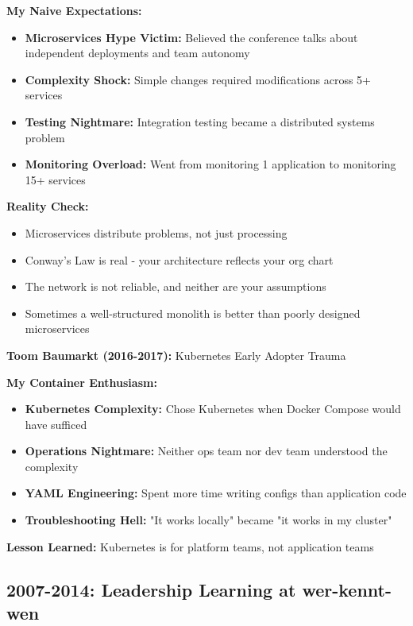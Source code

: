 \documentclass[10pt,a4paper]{article}
\begin{document}
\textbf{My Naive Expectations:}
\begin{itemize}[leftmargin=10pt,itemsep=1pt]
\item \textbf{Microservices Hype Victim:} Believed the conference talks about independent deployments and team autonomy
\item \textbf{Complexity Shock:} Simple changes required modifications across 5+ services
\item \textbf{Testing Nightmare:} Integration testing became a distributed systems problem
\item \textbf{Monitoring Overload:} Went from monitoring 1 application to monitoring 15+ services
\end{itemize}

\textbf{Reality Check:}
\begin{itemize}[leftmargin=10pt,itemsep=1pt]
\item Microservices distribute problems, not just processing
\item Conway's Law is real - your architecture reflects your org chart
\item The network is not reliable, and neither are your assumptions
\item Sometimes a well-structured monolith is better than poorly designed microservices
\end{itemize}

\textbf{Toom Baumarkt (2016-2017):} Kubernetes Early Adopter Trauma

\textbf{My Container Enthusiasm:}
\begin{itemize}[leftmargin=10pt,itemsep=1pt]
\item \textbf{Kubernetes Complexity:} Chose Kubernetes when Docker Compose would have sufficed
\item \textbf{Operations Nightmare:} Neither ops team nor dev team understood the complexity
\item \textbf{YAML Engineering:} Spent more time writing configs than application code
\item \textbf{Troubleshooting Hell:} "It works locally" became "it works in my cluster"
\end{itemize}

\textbf{Lesson Learned:} Kubernetes is for platform teams, not application teams

\subsection{2007-2014: Leadership Learning at wer-kennt-wen}
\end{document}
